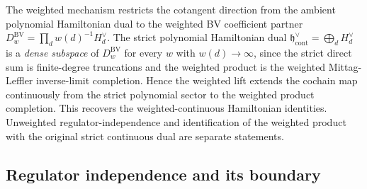 \begin{rmk}\label{rmk:wt-sector-restriction}
  The weighted mechanism restricts the cotangent direction from the
  ambient polynomial Hamiltonian dual to the weighted BV coefficient partner
  $D^{\mathrm{BV}}_w=\prod_d w(d)^{-1}H_d^\vee$.
  The strict polynomial Hamiltonian dual
  $\mathfrak h^\vee_{\mathrm{cont}}=\bigoplus_d H_d^\vee$ is a
  \emph{dense subspace} of $D^{\mathrm{BV}}_w$
  for every $w$ with $w(d)\to\infty$, since the strict direct sum
  is finite-degree truncations and the weighted product is the
  weighted Mittag-Leffler inverse-limit completion. Hence the
  weighted lift extends the cochain map continuously from the strict
  polynomial sector to the weighted product completion. This recovers
  the weighted-continuous Hamiltonian identities. Unweighted
  regulator-independence and identification of the weighted product with
  the original strict continuous dual are separate statements.
\end{rmk}

\subsection*{Regulator independence and its boundary}

